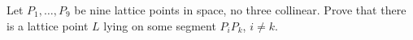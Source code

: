 Let $P_1, \ldots, P_9$ be nine lattice points in space, no three collinear. Prove that there is a lattice point $L$ lying on some segment $P_iP_k$, $i \neq k$.
